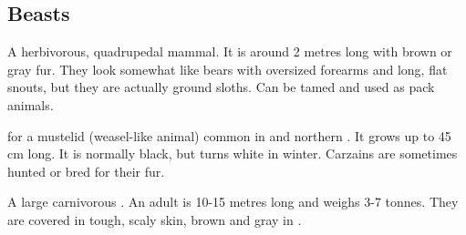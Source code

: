 \subsection{Beasts}
\begin{gloss}







\begin{comment}
\paragraph{\belwan}
\end{comment}
\gitem{\belwan}
A herbivorous, quadrupedal mammal. 
It is around 2 metres long with brown or gray fur. 
They look somewhat like bears with oversized forearms and long, flat snouts, but they are actually ground sloths. 
Can be tamed and used as pack animals. 








\begin{comment}
\paragraph{carzain (animal)}
\end{comment}
 for a mustelid (weasel-like animal) common in  and northern . 
It grows up to 45 cm long. 
It is normally black, but turns white in winter. 
Carzains are sometimes hunted or bred for their fur. 







\begin{comment}
\paragraph{\corgorah}
\end{comment}
\gitem[\corgoroth]{\corgorah}
A large carnivorous . 
An adult is 10-15 metres long and weighs 3-7 tonnes. 
They are covered in tough, scaly skin, brown and gray in \colour. 


\end{gloss}
